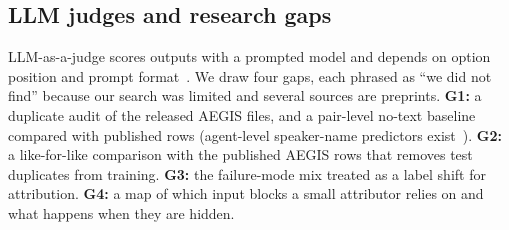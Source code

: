 \documentclass[conference]{IEEEtran}
\begin{document}
\subsection{LLM judges and research gaps}
LLM-as-a-judge scores outputs with a prompted model and depends on option position and prompt format~\cite{zheng}. We draw four gaps, each phrased as ``we did not find'' because our search was limited and several sources are preprints. \textbf{G1:} a duplicate audit of the released AEGIS files, and a pair-level no-text baseline compared with published rows (agent-level speaker-name predictors exist~\cite{audit2}). \textbf{G2:} a like-for-like comparison with the published AEGIS rows that removes test duplicates from training. \textbf{G3:} the failure-mode mix treated as a label shift for attribution. \textbf{G4:} a map of which input blocks a small attributor relies on and what happens when they are hidden.
\end{document}
